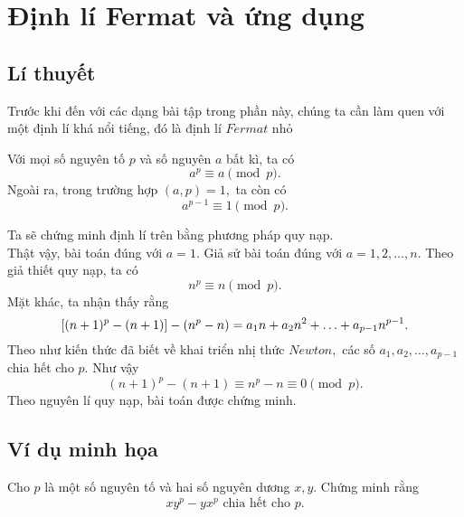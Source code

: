 \section{Định lí Fermat và ứng dụng}

\subsection{Lí thuyết}

Trước khi đến với các dạng bài tập trong phần này, chúng ta cần làm quen với một định lí khá nổi tiếng, đó là định lí $Fermat$ nhỏ
\begin{light}
Với mọi số nguyên tố $p$ và số nguyên $a$ bất kì, ta có
\[a^p\equiv a\pmod{p}.\]
Ngoài ra, trong trường hợp $(a,p)=1,$ ta còn có
\[a^{p-1}\equiv 1\pmod{p}.\]
\end{light}
 Ta sẽ chứng minh định lí trên bằng phương pháp quy nạp.\\
Thật vậy, bài toán đúng với $a=1.$ Giả sử bài toán đúng với $a=1,2,\ldots,n.$ Theo giả thiết quy nạp, ta có
$$n^p\equiv n\pmod{p}.$$
Mặt khác, ta nhận thấy rằng
$$\left[ (n+1)^p-(n+1) \right]-\left(\displaystyle n^p-n \right)=a_1n+a_2n^2+\ldots+a_{p-1}n^{p-1}.$$
Theo như kiến thức đã biết về khai triển nhị thức $Newton,$ các số $a_1,a_2,\ldots,a_{p-1}$ chia hết cho $p.$ Như vậy
$$(n+1)^p-(n+1)\equiv n^p-n\equiv0\pmod{p}.$$
Theo nguyên lí quy nạp, bài toán được chứng minh.

\subsection{Ví dụ minh họa}

\begin{bx}
Cho $p$ là một số nguyên tố và hai số nguyên dương $x,y$. Chứng minh rằng 
\[x y^{p}-y x^{p}\text{ chia hết cho }p.\]
\end{bx}

